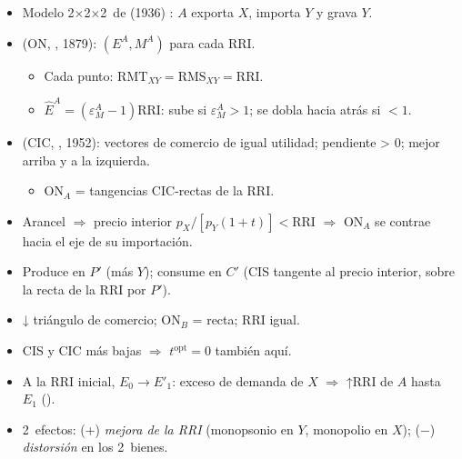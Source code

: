 \documentclass{article}
\begin{document}
\begin{columnas}
\begin{itemize}
\item Modelo 2×2×2~de  (1936) : $A$ exporta $X$, importa $Y$ y grava $Y$.
\end{itemize}
\begin{itemize}
\item {} (ON, , 1879): $(E^A,M^A)$ para cada RRI.
  \begin{itemize}
  \item Cada punto: $\mathrm{RMT}_{XY}=\mathrm{RMS}_{XY}=\mathrm{RRI}$.
  \item $\hat E^A=(\varepsilon^A_M-1)\widehat{\mathrm{RRI}}$: sube si $\varepsilon^A_M>1$; se dobla hacia atrás si $<1$.
  \end{itemize}
\item {} (CIC, , 1952): vectores de comercio de igual utilidad; pendiente > 0; mejor arriba y a la izquierda.
  \begin{itemize}
  \item ON$_A$ = tangencias CIC-rectas de la RRI.
  \end{itemize}
\item Arancel $\Rightarrow$ precio interior $p_X/[p_Y(1+t)]<\mathrm{RRI}$ $\Rightarrow$ ON$_A$ se contrae hacia el eje de su importación.
\end{itemize}
\begin{itemize}
\item Produce en $P'$ (más $Y$); consume en $C'$ (CIS tangente al precio interior, sobre la recta de la RRI por $P'$).
\item ↓ triángulo de comercio; ON$_B$ = recta; RRI igual.
\item CIS y CIC más bajas $\Rightarrow$ $t^{\mathrm{opt}}=0$ también aquí.
\end{itemize}
\begin{itemize}
\item A la RRI inicial, $E_0\to E'_1$: exceso de demanda de $X$ $\Rightarrow$ ↑RRI de $A$ hasta $E_1$ ().
\item 2~efectos: (+) \emph{mejora de la RRI} (monopsonio en $Y$, monopolio en $X$); ($-$) \emph{distorsión} en los 2~bienes.
\end{itemize}
\begin{itemize}

\end{itemize}
\end{columnas}
\end{document}
